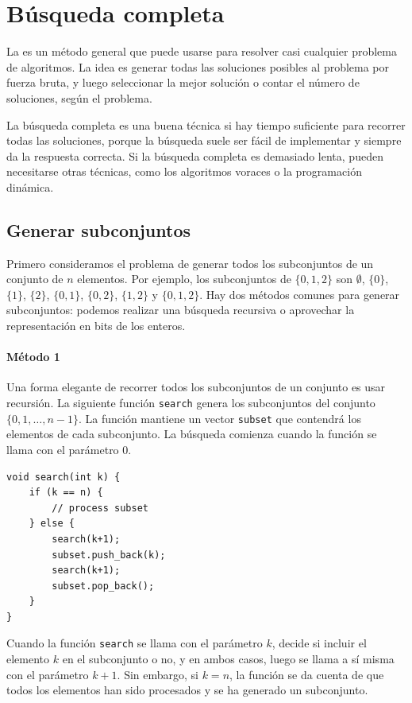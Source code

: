 \chapter{Búsqueda completa}

La 
es un método general que puede usarse
para resolver casi cualquier problema de algoritmos.
La idea es generar todas las soluciones
posibles al problema por fuerza bruta,
y luego seleccionar la mejor solución o contar el
número de soluciones, según el problema.

La búsqueda completa es una buena técnica
si hay tiempo suficiente para recorrer todas las soluciones,
porque la búsqueda suele ser fácil de implementar
y siempre da la respuesta correcta.
Si la búsqueda completa es demasiado lenta,
pueden necesitarse otras técnicas, como los algoritmos voraces o
la programación dinámica.

\section{Generar subconjuntos}


Primero consideramos el problema de generar
todos los subconjuntos de un conjunto de $n$ elementos.
Por ejemplo, los subconjuntos de $\{0,1,2\}$ son
$\emptyset$, $\{0\}$, $\{1\}$, $\{2\}$, $\{0,1\}$,
$\{0,2\}$, $\{1,2\}$ y $\{0,1,2\}$.
Hay dos métodos comunes para generar subconjuntos:
podemos realizar una búsqueda recursiva
o aprovechar la representación en bits de los enteros.

\subsubsection{Método 1}

Una forma elegante de recorrer todos los subconjuntos
de un conjunto es usar recursión.
La siguiente función \texttt{search}
genera los subconjuntos del conjunto
$\{0,1,\ldots,n-1\}$.
La función mantiene un vector \texttt{subset}
que contendrá los elementos de cada subconjunto.
La búsqueda comienza cuando la función se llama
con el parámetro 0.

\begin{lstlisting}
void search(int k) {
    if (k == n) {
        // process subset
    } else {
        search(k+1);
        subset.push_back(k);
        search(k+1);
        subset.pop_back();
    }
}
\end{lstlisting}

Cuando la función \texttt{search}
se llama con el parámetro $k$,
decide si incluir el
elemento $k$ en el subconjunto o no,
y en ambos casos,
luego se llama a sí misma con el parámetro $k+1$.
Sin embargo, si $k=n$, la función se da cuenta de que
todos los elementos han sido procesados
y se ha generado un subconjunto.

